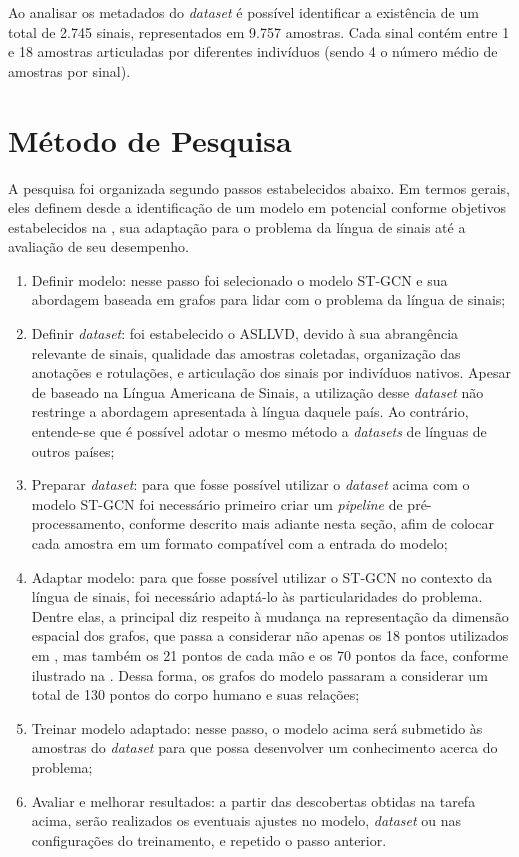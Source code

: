 Ao analisar os metadados do \textit{dataset} é possível identificar a existência de um total de 2.745 sinais, representados em 9.757 amostras. Cada sinal contém entre 1 e 18 amostras articuladas por diferentes indivíduos (sendo 4 o número médio de amostras por sinal).


\section{Método de Pesquisa} %

A pesquisa foi organizada segundo passos estabelecidos abaixo. Em termos gerais, eles definem desde a identificação de um modelo em potencial conforme objetivos estabelecidos na , sua adaptação para o problema da língua de sinais até a avaliação de seu desempenho.

\begin{enumerate}
    \item Definir modelo: nesse passo foi selecionado o modelo ST-GCN e sua abordagem baseada em grafos para lidar com o problema da língua de sinais;
    \item Definir \textit{dataset}: foi estabelecido o ASLLVD, devido à sua abrangência relevante de sinais, qualidade das amostras coletadas, organização das anotações e rotulações, e articulação dos sinais por indivíduos nativos. Apesar de baseado na Língua Americana de Sinais, a utilização desse \textit{dataset} não restringe a abordagem apresentada à língua daquele país. Ao contrário, entende-se que é possível adotar o mesmo método a \textit{datasets} de línguas de outros países;
    \item Preparar \textit{dataset}: para que fosse possível utilizar o \textit{dataset} acima com o modelo ST-GCN foi necessário primeiro criar um \textit{pipeline} de pré-processamento, conforme descrito mais adiante nesta seção, afim de colocar cada amostra em  um formato compatível com a entrada do modelo;
    \item Adaptar modelo: para que fosse possível utilizar o ST-GCN no contexto da língua de sinais, foi necessário adaptá-lo às particularidades do problema. Dentre elas, a principal diz respeito à mudança na representação da dimensão espacial dos grafos, que passa a considerar não apenas os 18 pontos utilizados em \cite{st-gcn-2018}, mas também os 21 pontos de cada mão e os 70 pontos da face, conforme ilustrado na . Dessa forma, os grafos do modelo passaram a considerar um total de 130 pontos do corpo humano e suas relações;
    \item Treinar modelo adaptado: nesse passo, o modelo acima será submetido às amostras do \textit{dataset} para que possa desenvolver um conhecimento acerca do problema;
    \item Avaliar e melhorar resultados: a partir das descobertas obtidas na tarefa acima, serão realizados os eventuais ajustes no modelo, \textit{dataset} ou nas configurações do treinamento, e repetido o passo anterior.
\end{enumerate}


